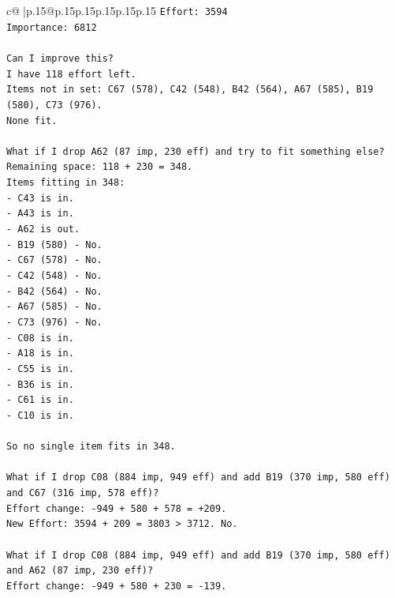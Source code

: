 \documentclass{article}
\begin{document}
{\begin{supertabular}{c@{$\;$}|p{.15\linewidth}@{}p{.15\linewidth}p{.15\linewidth}p{.15\linewidth}p{.15\linewidth}p{.15\linewidth}}
{{{\texttt{Effort: 3594} \\
\texttt{Importance: 6812} \\
\\ 
\texttt{Can I improve this?} \\
\texttt{I have 118 effort left.} \\
\texttt{Items not in set: C67 (578), C42 (548), B42 (564), A67 (585), B19 (580), C73 (976).} \\
\texttt{None fit.} \\
\\ 
\texttt{What if I drop A62 (87 imp, 230 eff) and try to fit something else?} \\
\texttt{Remaining space: 118 + 230 = 348.} \\
\texttt{Items fitting in 348:} \\
\texttt{{-} C43 is in.} \\
\texttt{{-} A43 is in.} \\
\texttt{{-} A62 is out.} \\
\texttt{{-} B19 (580) {-} No.} \\
\texttt{{-} C67 (578) {-} No.} \\
\texttt{{-} C42 (548) {-} No.} \\
\texttt{{-} B42 (564) {-} No.} \\
\texttt{{-} A67 (585) {-} No.} \\
\texttt{{-} C73 (976) {-} No.} \\
\texttt{{-} C08 is in.} \\
\texttt{{-} A18 is in.} \\
\texttt{{-} C55 is in.} \\
\texttt{{-} B36 is in.} \\
\texttt{{-} C61 is in.} \\
\texttt{{-} C10 is in.} \\
\\ 
\texttt{So no single item fits in 348.} \\
\\ 
\texttt{What if I drop C08 (884 imp, 949 eff) and add B19 (370 imp, 580 eff) and C67 (316 imp, 578 eff)?} \\
\texttt{Effort change: {-}949 + 580 + 578 = +209.} \\
\texttt{New Effort: 3594 + 209 = 3803 > 3712. No.} \\
\\ 
\texttt{What if I drop C08 (884 imp, 949 eff) and add B19 (370 imp, 580 eff) and A62 (87 imp, 230 eff)?} \\
\texttt{Effort change: {-}949 + 580 + 230 = {-}139.} \\
}}}
\end{supertabular}}
\end{document}
